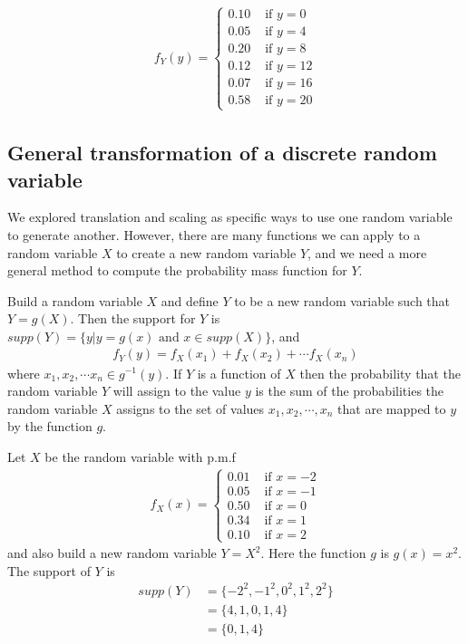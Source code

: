 \begin{align}
    f_{Y}(y) = \begin{cases}
                0.10 & \text{ if } y= 0\\
                0.05 & \text{ if } y= 4\\
                0.20 & \text{ if } y= 8\\
                0.12 & \text{ if } y= 12\\
                0.07 & \text{ if } y= 16\\
                0.58 & \text{ if } y= 20
               \end{cases}
\end{align}

\subsection{General transformation of a discrete random variable}

We explored translation and scaling as specific ways to use one random variable to generate another.
However, there are many functions we can apply to a random variable $X$ to create a new random variable $Y$, and we need a more general method to compute the probability mass function for $Y$.

Build a random variable $X$ and define $Y$ to be a new random variable such that $Y = g(X)$.
Then the support for $Y$ is $supp(Y) = \{y | y = g(x) \text{ and } x \in supp(X) \}$, and 
\begin{align}
    f_{Y}(y) = f_{X}(x_{1}) + f_{X}(x_{2}) + \cdots f_{X}(x_{n})  
\end{align}
where $x_{1},x_{2}, \cdots x_{n} \in g^{-1}(y)$.
If $Y$ is a function of $X$ then the probability that the random variable $Y$ will assign to the value $y$ is the sum of the probabilities the random variable $X$ assigns to the set of values $x_{1},x_{2},\cdots,x_{n}$ that are mapped to $y$ by the function $g$.

\ex Let $X$ be the random variable with p.m.f
\begin{align}
    f_{X}(x) = \begin{cases}
                0.01 & \text{ if } x=-2 \\  
                0.05 & \text{ if } x =-1\\
                0.50 & \text{ if } x=0\\
                0.34 & \text{ if } x=1\\
                0.10 & \text{ if } x=2
               \end{cases}
\end{align}
and also build a new random variable $Y = X^{2}$. 
Here the function $g$ is $g(x) = x^{2}$.
The support of $Y$ is 
\begin{align}
    supp(Y) & = \{ -2^{2},-1^{2},0^{2},1^{2},2^{2} \}\\
            & = \{ 4,1,0,1,4 \}\\
            & = \{ 0,1,4 \}
\end{align}

